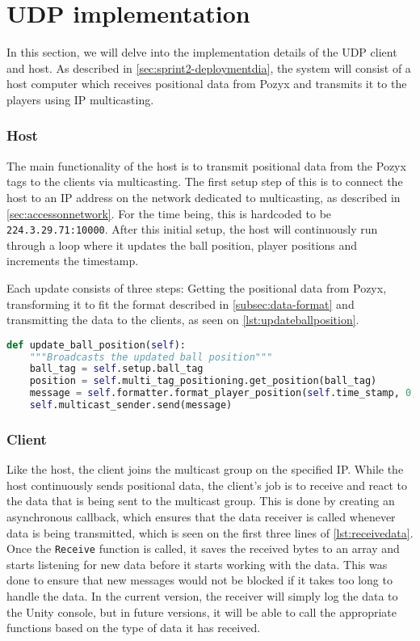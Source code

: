 \section{UDP implementation}
In this section, we will delve into the implementation details of the UDP client and host.
As described in \autoref{sec:sprint2-deploymentdia}, the system will consist of a host computer which receives positional data from Pozyx and transmits it to the players using IP multicasting.

\subsubsection{Host}
The main functionality of the host is to transmit positional data from the Pozyx tags to the clients via multicasting.
The first setup step of this is to connect the host to an IP address on the network dedicated to multicasting, as described in \autoref{sec:accessonnetwork}.
For the time being, this is hardcoded to be \texttt{224.3.29.71:10000}.
After this initial setup, the host will continuously run through a loop where it updates the ball position, player positions and increments the timestamp.

Each update consists of three steps: Getting the positional data from Pozyx, transforming it to fit the format described in \autoref{subsec:data-format} and transmitting the data to the clients, as seen on \autoref{lst:updateballposition}.

\begin{lstlisting}[caption={Updating ball position},language=Python,label={lst:updateballposition}]
def update_ball_position(self):
    """Broadcasts the updated ball position"""
    ball_tag = self.setup.ball_tag
    position = self.multi_tag_positioning.get_position(ball_tag)
    message = self.formatter.format_player_position(self.time_stamp, 0, position.x, position.y)
    self.multicast_sender.send(message)
\end{lstlisting}

\subsubsection{Client}
Like the host, the client joins the multicast group on the specified IP.
While the host continuously sends positional data, the client's job is to receive and react to the data that is being sent to the multicast group.
This is done by creating an asynchronous callback, which ensures that the data receiver is called whenever data is being transmitted, which is seen on the first three lines of \autoref{lst:receivedata}.
Once the \texttt{Receive} function is called, it saves the received bytes to an array and starts listening for new data before it starts working with the data.
This was done to ensure that new messages would not be blocked if it takes too long to handle the data.
In the current version, the receiver will simply log the data to the Unity console, but in future versions, it will be able to call the appropriate functions based on the type of data it has received.

